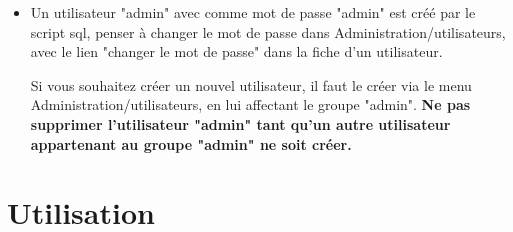 \documentclass[12pt,a4paper]{report}
\begin{document}
\begin{itemize}
\item Un utilisateur "admin" avec comme mot de passe "admin" est créé par le script sql, penser à changer le mot de passe dans Administration/utilisateurs, avec le lien "changer le mot de passe" dans la fiche d'un utilisateur.

Si vous souhaitez créer un nouvel utilisateur, il faut le créer via le menu Administration/utilisateurs, en lui affectant le groupe "admin". 
\textbf{Ne pas supprimer l'utilisateur "admin" tant qu'un autre utilisateur appartenant au groupe "admin" ne soit créer.}

\end{itemize}



\chapter{Utilisation}
\end{document}
